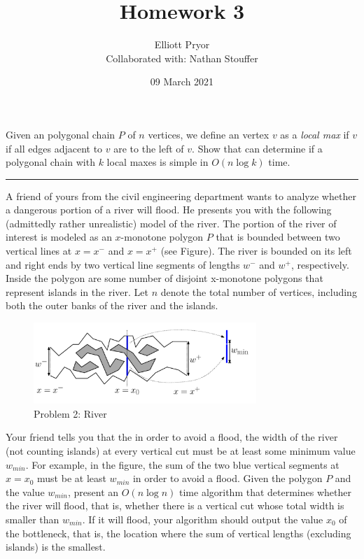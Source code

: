 \documentclass[11pt]{article}
\title{Homework 3}
\author{Elliott Pryor \\
Collaborated with: Nathan Stouffer}
\date{09 March 2021}
\begin{document}
\maketitle


Given an polygonal chain $P$ of $n$ vertices, we define an vertex $v$ as a
\emph{local max} if $v$ if all edges adjacent to $v$ are to the left of $v$.
Show that can determine if a polygonal chain with $k$ local maxes is simple in
$O(n \log k)$ time.

\hrule








A friend of yours from the civil engineering department wants to analyze whether
a dangerous portion of a river will flood. He presents you with the following
(admittedly rather unrealistic) model of the river. The portion of the river of
interest is modeled as an $x$-monotone polygon $P$ that is bounded between two
vertical lines at $x = x^-$ and $x = x^+$ (see Figure). The river is bounded on
its left and right ends by two vertical line segments of lengths $w^-$ and
$w^+$, respectively. Inside the polygon are some number of disjoint x-monotone
polygons that represent islands in the river.  Let $n$ denote the total number
of vertices, including both the outer banks of the river and the islands.

\begin{figure}[h]
    \centering
    \includegraphics[width=0.75\textwidth]{river}
    \caption{Problem 2: River}
\end{figure}

Your friend tells you that the in order to avoid a flood, the width of the river
(not counting islands) at every vertical cut must be at least some minimum value
$w_{min}$. For example, in the figure, the sum of the two blue vertical segments
at $x = x_0$ must be at least $w_{min}$ in order to avoid a flood.  Given the
polygon $P$ and the value $w_{min}$, present an $O(n \log n)$ time algorithm that
determines whether the river will flood, that is, whether there is a vertical
cut whose total width is smaller than $w_{min}$. If it will flood, your algorithm
should output the value $x_0$ of the bottleneck, that is, the location where the
sum of vertical lengths (excluding islands) is the smallest.
\end{document}
